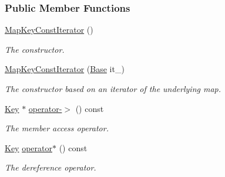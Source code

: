 \subsubsection*{Public Member Functions}
\begin{DoxyCompactItemize}
\item 
\hyperlink{structslb_1_1core_1_1util_1_1MapKeyConstIterator_adc0549365bc74f1be9477dde5f99fec9}{Map\+Key\+Const\+Iterator} ()\hypertarget{structslb_1_1core_1_1util_1_1MapKeyConstIterator_adc0549365bc74f1be9477dde5f99fec9}{}\label{structslb_1_1core_1_1util_1_1MapKeyConstIterator_adc0549365bc74f1be9477dde5f99fec9}

\begin{DoxyCompactList}\small\item\em The constructor. \end{DoxyCompactList}\item 
\hyperlink{structslb_1_1core_1_1util_1_1MapKeyConstIterator_aaa68b642acc1f67fdb4c7a70a5532c69}{Map\+Key\+Const\+Iterator} (\hyperlink{structslb_1_1core_1_1util_1_1MapKeyConstIterator_a9eb6587b8011f451cb49ead9a1cd437e}{Base} it\+\_\+)\hypertarget{structslb_1_1core_1_1util_1_1MapKeyConstIterator_aaa68b642acc1f67fdb4c7a70a5532c69}{}\label{structslb_1_1core_1_1util_1_1MapKeyConstIterator_aaa68b642acc1f67fdb4c7a70a5532c69}

\begin{DoxyCompactList}\small\item\em The constructor based on an iterator of the underlying map. \end{DoxyCompactList}\item 
\hyperlink{structslb_1_1core_1_1util_1_1MapKeyConstIterator_a98657d57422f971f27ae68bcd34d4543}{Key} $\ast$ \hyperlink{structslb_1_1core_1_1util_1_1MapKeyConstIterator_accd8916d03d7debbf78230c189a3b434}{operator-\/$>$} () const 
\begin{DoxyCompactList}\small\item\em The member access operator. \end{DoxyCompactList}\item 
\hyperlink{structslb_1_1core_1_1util_1_1MapKeyConstIterator_a98657d57422f971f27ae68bcd34d4543}{Key} \hyperlink{structslb_1_1core_1_1util_1_1MapKeyConstIterator_aed11ff23d03af216f470eb266d1e1d5f}{operator$\ast$} () const 
\begin{DoxyCompactList}\small\item\em The dereference operator. \end{DoxyCompactList}\end{DoxyCompactItemize}



